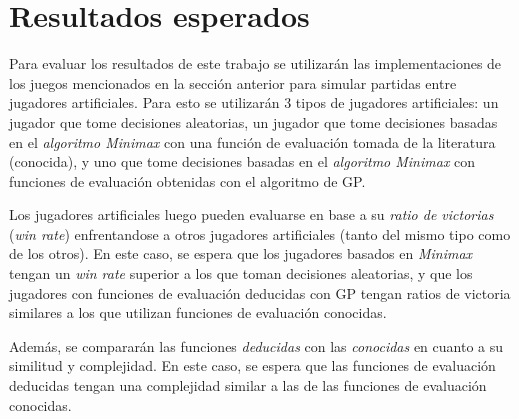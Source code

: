 \section{Resultados esperados}
  Para evaluar los resultados de este trabajo se utilizarán las implementaciones de los juegos 
  mencionados en la sección anterior para simular partidas entre jugadores artificiales.
  Para esto se utilizarán 3 tipos de jugadores artificiales: un jugador que tome decisiones 
  aleatorias, un jugador que tome decisiones basadas en el \textit{algoritmo Minimax} con una 
  función de evaluación tomada de la literatura (conocida), y uno que tome decisiones basadas en el 
  \textit{algoritmo Minimax} con funciones de evaluación obtenidas con el algoritmo de GP.
  
  Los jugadores artificiales luego pueden evaluarse en base a su \textit{ratio de victorias} 
  (\textit{win rate}) enfrentandose a otros jugadores artificiales (tanto del mismo tipo 
  como de los otros).
  En este caso, se espera que los jugadores basados en \textit{Minimax} tengan un \textit{win rate}
  superior a los que toman decisiones aleatorias, y que los jugadores con funciones de evaluación
  deducidas con GP tengan ratios de victoria similares a los que utilizan funciones de evaluación
  conocidas.

  Además, se compararán las funciones \textit{deducidas} con las \textit{conocidas} en cuanto a su
  similitud y complejidad.
  En este caso, se espera que las funciones de evaluación deducidas tengan una complejidad similar a
  las de las funciones de evaluación conocidas.